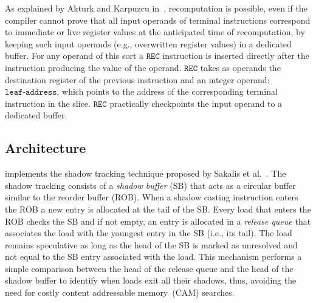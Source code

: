 As explained by Akturk and Karpuzcu in~\cite{amnesiac17}, recomputation is possible, even if the compiler cannot prove that all input operands of
terminal instructions correspond to immediate or live register values at the anticipated
time of recomputation, by keeping such input operands (e.g., overwritten register values) in a dedicated buffer.
For any operand of this sort a $\texttt{REC}$
instruction is inserted directly after the instruction producing the value of the operand.
%
$\texttt{REC}$ takes as operands the destination register of the previous instruction and an
integer operand:
$\texttt{leaf-address}$, which points to the address of
the corresponding terminal instruction in the slice.  
$\texttt{REC}$ practically checkpoints the input
operand 
to a dedicated buffer. 

\subsection{\arch{} Architecture}
\label{sec:iser-architecture}

\arch{} implements the shadow tracking technique proposed by Sakalis et al.~\cite{sakalis+:ISCA2019vp}. %
The shadow tracking consists of a \textit{shadow buffer} (SB) that acts as a circular buffer similar to the reorder buffer (ROB). %
When a shadow casting instruction enters the ROB a new entry is allocated at the tail of the SB. %
Every load that enters the ROB checks the SB and if not empty, an entry is allocated in a \textit{release queue} that associates the load with the youngest entry in the SB (i.e., its tail). %
The load remains speculative as long as the head of the SB is marked as unresolved and not equal to the SB entry associated with the load. %
This mechanism performs a simple comparison between the head of the release queue and the head of the shadow buffer to identify when loads exit all their shadows,
thus, avoiding the need for costly content addressable memory~(CAM) searches. %


